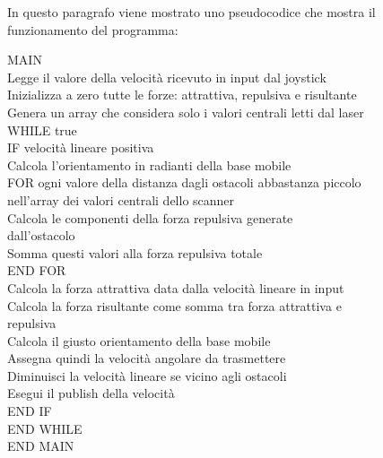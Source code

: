In questo paragrafo viene mostrato uno pseudocodice che mostra il funzionamento del programma:
\begin{tabbing}
	MAIN\\ 
	\quad \quad Legge il valore della velocità ricevuto in input dal joystick\\
	\quad \quad Inizializza a zero tutte le forze: attrattiva, repulsiva e risultante\\
	\quad \quad Genera un array che considera solo i valori centrali letti dal laser\\
	\quad \quad WHILE true\\
	\quad \quad \quad \quad IF velocità lineare positiva\\
	\quad \quad \quad \quad \quad \quad Calcola l’orientamento in radianti della base mobile \\
	\quad \quad \quad \quad \quad \quad FOR ogni valore della distanza dagli ostacoli abbastanza piccolo\\
	\quad \quad \quad \quad \quad \quad nell'array dei valori centrali dello scanner\\
	\quad \quad \quad \quad \quad \quad \quad \quad Calcola le componenti della forza repulsiva generate\\ \quad \quad \quad \quad \quad \quad \quad \quad dall’ostacolo\\
	\quad \quad \quad \quad \quad \quad \quad \quad Somma questi valori alla forza repulsiva totale \\
	\quad \quad \quad \quad \quad \quad END FOR\\
	\quad \quad \quad \quad \quad \quad Calcola la forza attrattiva data dalla velocità lineare in input\\
	\quad \quad \quad \quad \quad \quad Calcola la forza risultante come somma tra forza attrattiva e\\
	\quad \quad \quad \quad \quad \quad repulsiva\\
	\quad \quad \quad \quad \quad \quad Calcola il giusto orientamento della base mobile\\
	\quad \quad \quad \quad \quad \quad Assegna quindi la velocità angolare da trasmettere\\
	\quad \quad \quad \quad \quad \quad Diminuisci la velocità lineare se vicino agli ostacoli\\
	\quad \quad \quad \quad \quad \quad Esegui il publish della velocità\\ 
	\quad \quad \quad \quad END IF\\
	\quad \quad END WHILE\\
	END MAIN
\end{tabbing}



